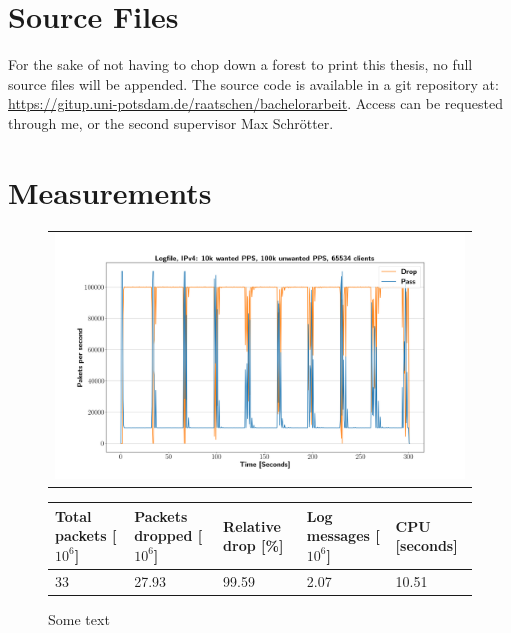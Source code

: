 \chapter{Source Files}
For the sake of not having to chop down a forest to print this thesis, no full source files will be appended.
The source code is available in a git repository at: \href{https://gitup.uni-potsdam.de/raatschen/bachelorarbeit}{https://gitup.uni-potsdam.de/raatschen/bachelorarbeit}.
Access can be requested through me, or the second supervisor Max Schrötter.

\chapter{Measurements}


\begin{figure}[h!p]
	\label{fig:simplefail2ban:disk:ip4:100k}
	\centering
	\scriptsize
	\begin{tabular}{c}
    	\centerline{\includegraphics[width=1.2\textwidth]{images/simplefail2ban_disk_ipv4_v10k_iv100k_c65534.png}}
	\end{tabular}
	\begin{tabular}{lllll}
		\toprule
		\textbf{Total packets [$10^6$]} & \textbf{Packets dropped [$10^6$]} & \textbf{Relative drop [\%]} & \textbf{Log messages [$10^6$]} & \textbf{CPU [seconds]} \\ \midrule 
		33 & 27.93 & 99.59 & 2.07 & 10.51 \\
		\bottomrule
	\end{tabular}
	\caption[Simplefail2ban, Logfile IPv4, 100k \ac{PPS}]{Some text}
\end{figure}

